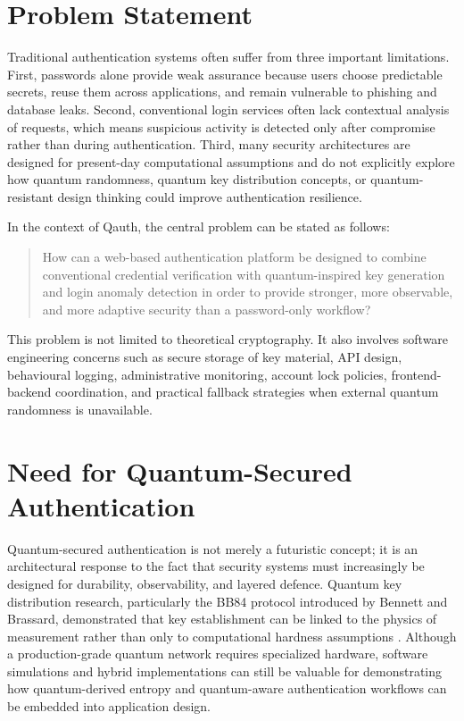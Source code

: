 \section{Problem Statement}
Traditional authentication systems often suffer from three important limitations. First, passwords alone provide weak assurance because users choose predictable secrets, reuse them across applications, and remain vulnerable to phishing and database leaks. Second, conventional login services often lack contextual analysis of requests, which means suspicious activity is detected only after compromise rather than during authentication. Third, many security architectures are designed for present-day computational assumptions and do not explicitly explore how quantum randomness, quantum key distribution concepts, or quantum-resistant design thinking could improve authentication resilience.

In the context of Qauth, the central problem can be stated as follows:

\begin{quote}
How can a web-based authentication platform be designed to combine conventional credential verification with quantum-inspired key generation and login anomaly detection in order to provide stronger, more observable, and more adaptive security than a password-only workflow?
\end{quote}

This problem is not limited to theoretical cryptography. It also involves software engineering concerns such as secure storage of key material, API design, behavioural logging, administrative monitoring, account lock policies, frontend-backend coordination, and practical fallback strategies when external quantum randomness is unavailable.

\section{Need for Quantum-Secured Authentication}
Quantum-secured authentication is not merely a futuristic concept; it is an architectural response to the fact that security systems must increasingly be designed for durability, observability, and layered defence. Quantum key distribution research, particularly the BB84 protocol introduced by Bennett and Brassard, demonstrated that key establishment can be linked to the physics of measurement rather than only to computational hardness assumptions \cite{bb84}. Although a production-grade quantum network requires specialized hardware, software simulations and hybrid implementations can still be valuable for demonstrating how quantum-derived entropy and quantum-aware authentication workflows can be embedded into application design.

